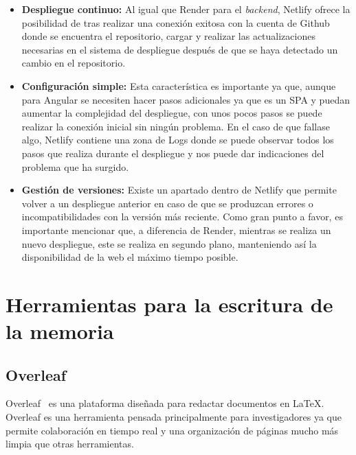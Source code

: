  \begin{itemize}
     \item \textbf{Despliegue continuo: }
     Al igual que Render para el \textit{backend}, Netlify ofrece la posibilidad de tras realizar una conexión exitosa con la cuenta de Github donde se encuentra el repositorio, cargar y realizar las actualizaciones necesarias en el sistema de despliegue después de que se haya detectado un cambio en el repositorio.
     \item \textbf{Configuración simple: }
     Esta característica es importante ya que, aunque para Angular se necesiten hacer pasos adicionales ya que es un SPA y puedan aumentar la complejidad del despliegue, con unos pocos pasos se puede realizar la conexión inicial sin ningún problema. En el caso de que fallase algo, Netlify contiene una zona de Logs donde se puede observar todos los pasos que realiza durante el despliegue y nos puede dar indicaciones del problema que ha surgido.
    \item \textbf{Gestión de versiones: }
    Existe un apartado dentro de Netlify que permite volver a un despliegue anterior en caso de que se produzcan errores o incompatibilidades con la versión más reciente. Como gran punto a favor, es importante mencionar que, a diferencia de Render, mientras se realiza un nuevo despliegue, este se realiza en segundo plano, manteniendo así la disponibilidad de la web el máximo tiempo posible.
 \end{itemize}

\section{Herramientas para la escritura de la memoria}

\subsection{Overleaf}
Overleaf~\cite{Overleaf} es una plataforma diseñada para redactar documentos en \LaTeX. Overleaf es una herramienta pensada principalmente para investigadores ya que permite colaboración en tiempo real y una organización de páginas mucho más limpia que otras herramientas.

